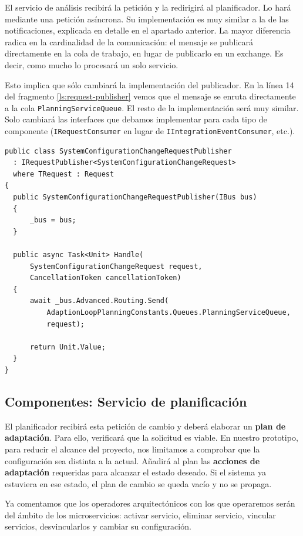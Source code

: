 El servicio de análisis recibirá la petición y la redirigirá al planificador. Lo hará mediante una petición asíncrona. Su implementación es muy similar a la de las notificaciones, explicada en detalle en el apartado anterior. La mayor diferencia radica en la cardinalidad de la comunicación: el mensaje se publicará directamente en la cola de trabajo, en lugar de publicarlo en un exchange. Es decir, como mucho lo procesará un solo servicio.

Esto implica que sólo cambiará la implementación del publicador. En la línea 14 del fragmento \ref{ls:request-publisher} vemos que el mensaje se enruta directamente a la cola \texttt{PlanningServiceQueue}. El resto de la implementación será muy similar. Solo cambiará las interfaces que debamos implementar para cada tipo de componente (\texttt{IRequestConsumer} en lugar de \texttt{IIntegrationEventConsumer}, etc.).

\begin{lstlisting}[language={[Sharp]C},caption={Las peticiones asíncronas se publican a una cola determinada.},captionpos=b, label=ls:request-publisher]
public class SystemConfigurationChangeRequestPublisher
  : IRequestPublisher<SystemConfigurationChangeRequest>
  where TRequest : Request
{
  public SystemConfigurationChangeRequestPublisher(IBus bus)
  {
      _bus = bus;
  }

  public async Task<Unit> Handle(
      SystemConfigurationChangeRequest request,
      CancellationToken cancellationToken)
  {
      await _bus.Advanced.Routing.Send(
          AdaptionLoopPlanningConstants.Queues.PlanningServiceQueue,
          request);

      return Unit.Value;
  }
}
\end{lstlisting}

\subsection{Componentes: Servicio de planificación}

El planificador recibirá esta petición de cambio y deberá elaborar un \textbf{plan de adaptación}. Para ello, verificará que la solicitud es viable. En nuestro prototipo, para reducir el alcance del proyecto, nos limitamos a comprobar que la configuración sea distinta a la actual. Añadirá al plan las \textbf{acciones de adaptación} requeridas para alcanzar el estado deseado. Si el sistema ya estuviera en ese estado, el plan de cambio se queda vacío y no se propaga.

Ya comentamos que los operadores arquitectónicos con los que operaremos serán del ámbito de los microservicios: activar servicio, eliminar servicio, vincular servicios, desvincularlos y cambiar su configuración.

